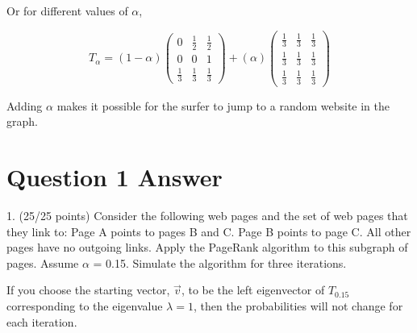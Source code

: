 \documentclass[12pt]{article}
\begin{document}
Or for different values of $\alpha$,

$$
T_{\alpha} = 
\left( 1 - \alpha \right)
\begin{pmatrix} 
  0 	& \frac{1}{2} 	& \frac{1}{2}  \\
  0 	& 0 			& 1 		 \\
  \frac{1}{3} 	& \frac{1}{3} 	& \frac{1}{3}
\end{pmatrix}
 + 
\left( \alpha \right)
\begin{pmatrix} 
  \frac{1}{3} 	& \frac{1}{3} 	& \frac{1}{3} \\
  \frac{1}{3} 	& \frac{1}{3} 	& \frac{1}{3} \\
  \frac{1}{3} 	& \frac{1}{3} 	& \frac{1}{3}
\end{pmatrix}
$$

Adding $\alpha$ makes it possible for the surfer to jump to a random website in the graph.

%
%

\section{Question 1 Answer}
1.	(25/25 points) Consider the following web pages and the set of web pages that they link to:
Page A points to pages B and C.
Page B points to page C.
All other pages have no outgoing links.
Apply the PageRank algorithm to this subgraph of pages. Assume $\alpha$ = 0.15. Simulate the algorithm for three iterations. 

If you choose the starting vector, $\vec{v}$, to be the left eigenvector of $T_{0.15}$ corresponding to the eigenvalue $\lambda = 1$, then the probabilities will not change for each iteration.

\begin{center}
\end{center}
\end{document}
